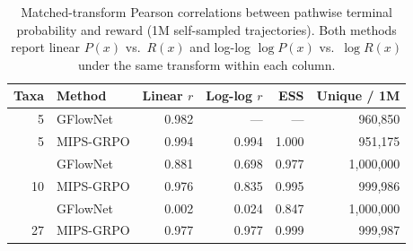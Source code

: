 \begin{table}[htbp]
\centering
\caption{Matched-transform Pearson correlations between pathwise terminal
probability and reward (1M self-sampled trajectories). Both methods report
linear $P(x)$ vs.\ $R(x)$ and log-log $\log P(x)$ vs.\ $\log R(x)$ under the
same transform within each column.}
\label{tab:phylo-matched}
\begin{tabular}{rlrrrr}
\toprule
Taxa & Method & Linear $r$ & Log-log $r$ & ESS & Unique / 1M \\
\midrule
5 & GFlowNet & 0.982 & --- & --- & 960{,}850 \\
5 & MIPS-GRPO & 0.994 & 0.994 & 1.000 & 951{,}175 \\
\addlinespace
10 & GFlowNet & 0.881 & 0.698 & 0.977 & 1{,}000{,}000 \\
10 & MIPS-GRPO & 0.976 & 0.835 & 0.995 & 999{,}986 \\
\addlinespace
27 & GFlowNet & 0.002 & 0.024 & 0.847 & 1{,}000{,}000 \\
27 & MIPS-GRPO & 0.977 & 0.977 & 0.999 & 999{,}987 \\
\bottomrule
\end{tabular}
\end{table}
